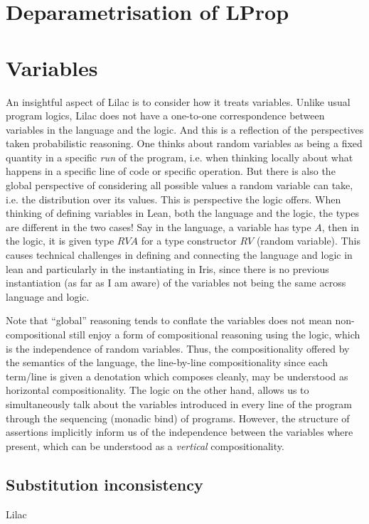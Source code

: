 \section{Deparametrisation of LProp}

\section{Variables}
An insightful aspect of Lilac is to consider how it treats variables. Unlike usual program logics, Lilac does not have a one-to-one correspondence between
variables in the language and the logic. And this  is a reflection of the perspectives taken probabilistic reasoning.
One thinks about random variables as being a fixed quantity in a specific \emph{run} of the program, i.e. when thinking locally about what happens in a specific
line of code or specific operation. But there is also the global perspective of considering all possible values a random variable can take, i.e. the distribution
over its values. This is perspective the logic offers.
When thinking of defining variables in Lean, both the language and the logic, the types are different in the two cases! Say in the language, a variable has type $A$,
then in the logic, it is given type $RV A$ for a type constructor $RV$ (random variable). This causes technical challenges in defining and connecting the language
and logic in lean and particularly in the instantiating in Iris, since there is no previous instantiation (as far as I am aware) of the variables not being the same across language and logic.

Note that ``global'' reasoning tends to conflate the variables  does not mean non-compositional still enjoy a form of compositional reasoning using
the logic, which is the independence of random variables. Thus, the compositionality offered by the semantics of the language, the line-by-line compositionality since
each term/line is given a denotation which composes cleanly, may be understood as horizontal compositionality. The logic on the other hand, allows us to simultaneously
talk about the variables introduced in every line of the program through the sequencing (monadic  bind) of programs. However, the structure of assertions implicitly
inform us of the independence between the variables where present, which can be understood as a \emph{vertical} compositionality.


\subsection{Substitution inconsistency}
Lilac
